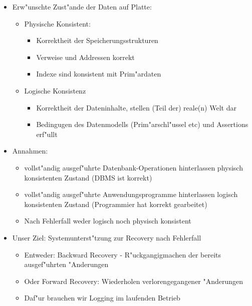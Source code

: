 \documentclass[a4paper, 12pt]{scrartcl}
\begin{document}
\begin{itemize}
\begin{itemize}
		\end{itemize}
	\item
		Erw"unschte Zust"ande der Daten auf Platte:
		\begin{itemize}
			\item
				Physische Konsistent:
				\begin{itemize}
					\item
						Korrektheit der Speicherungsstrukturen
					\item
						Verweise und Addressen korrekt
					\item
						Indexe sind konsistent mit Prim"ardaten
				\end{itemize}
			\item
				Logische Konsistenz
				\begin{itemize}
					\item
						Korrektheit der Dateninhalte, stellen (Teil der) reale(n) Welt dar
					\item
						Bedingugen des Datenmodells (Prim"arschl"ussel etc) und Assertions erf"ullt
				\end{itemize}
		\end{itemize}
	\item
		Annahmen:
		\begin{itemize}
			\item
				vollst"andig ausgef"uhrte Datenbank-Operationen hinterlassen physisch konsistenten Zustand (DBMS ist korrekt)
			\item
				vollst"andig ausgef"uhrte Anwendungsprogramme hinterlassen logisch konsistenten Zustand (Programmier hat korrekt gearbeitet)
			\item
				Nach Fehlerfall weder logisch noch physisch konsistent
		\end{itemize}
	\item
		Unser Ziel: Systemunterst"tzung zur Recovery nach Fehlerfall
		\begin{itemize}
			\item
				Entweder: Backward Recovery - R"uckgangigmachen der bereits ausgef"uhrten "Anderungen
			\item
				Oder Forward Recovery: Wiederholen verlorengegangener "Anderungen
			\item
				Daf"ur brauchen wir Logging im laufenden Betrieb
		\end{itemize}
\end{itemize}
\end{document}
